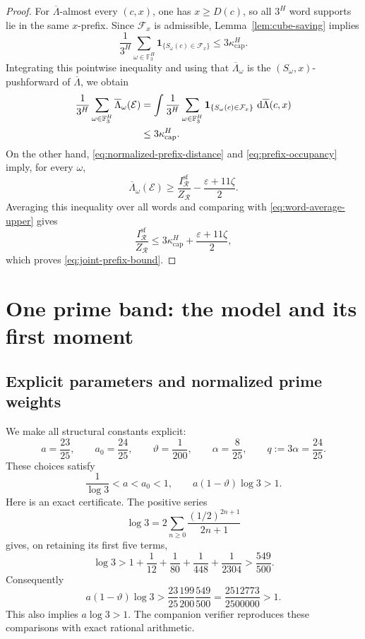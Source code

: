 \documentclass[11pt]{article}
\numberwithin{equation}{section}
\theoremstyle{plain}
\newcommand{\F}{\mathbb F}
\newcommand{\1}{\mathbf 1}
\newcommand{\dd}{\,\mathrm d}
\newcommand{\eps}{\varepsilon}
\newcommand{\cR}{\mathcal R}
\newcommand{\kappacap}{\kappa_{\mathrm{cap}}}
\begin{document}
\begin{proof}
For $\overline\Lambda$-almost every $(c,x)$, one has
$x\ge D(c)$, so all $3^H$ word supports lie in the same $x$-prefix.
Since $\mathcal F_x$ is admissible, Lemma~\ref{lem:cube-saving} implies
\[
 \frac1{3^H}\sum_{\omega\in\F_3^H}
 \1_{\{S_\omega(c)\in\mathcal F_x\}}
 \le3\kappacap^H.
\]
Integrating this pointwise inequality and using that
$\overline\Lambda_\omega$ is the $(S_\omega,x)$-pushforward of
$\overline\Lambda$, we obtain
\begin{align}
 \frac1{3^H}\sum_{\omega\in\F_3^H}
 \overline\Lambda_\omega(\mathcal E)
 &=\int\frac1{3^H}\sum_{\omega\in\F_3^H}
   \1_{\{S_\omega(c)\in\mathcal F_x\}}
   \,\dd\overline\Lambda(c,x)\notag\\
 &\le3\kappacap^H.                              \label{eq:word-average-upper}
\end{align}
On the other hand, \eqref{eq:normalized-prefix-distance} and
\eqref{eq:prefix-occupancy} imply, for every $\omega$,
\[
 \overline\Lambda_\omega(\mathcal E)
 \ge\frac{I_{\cR}^{\mathrm{sf}}}{Z_{\cR}}
      -\frac{\eps+11\zeta}{2}.
\]
Averaging this inequality over all words and comparing with
\eqref{eq:word-average-upper} gives
\[
 \frac{I_{\cR}^{\mathrm{sf}}}{Z_{\cR}}
 \le3\kappacap^H+\frac{\eps+11\zeta}{2},
\]
which proves \eqref{eq:joint-prefix-bound}.
\end{proof}

\section{One prime band: the model and its first moment}
\label{sec:firstmoment}

\subsection{Explicit parameters and normalized prime weights}

We make all structural constants explicit:
\begin{equation}\label{eq:parameters}
 a=\frac{23}{25},\qquad
 a_0=\frac{24}{25},\qquad
 \vartheta=\frac1{200},\qquad
 \alpha=\frac8{25},\qquad
 q:=3\alpha=\frac{24}{25}.
\end{equation}
These choices satisfy
\begin{equation}\label{eq:parameter-inequalities}
 \frac1{\log3}<a<a_0<1,
 \qquad
 a(1-\vartheta)\log3>1.
\end{equation}
Here is an exact certificate.  The positive series
\[
 \log3
 =2\sum_{n\ge0}\frac{(1/2)^{2n+1}}{2n+1}
\]
gives, on retaining its first five terms,
\[
 \log3>
 1+\frac1{12}+\frac1{80}+\frac1{448}+\frac1{2304}
 >\frac{549}{500}.
\]
Consequently
\[
 a(1-\vartheta)\log3
 >
 \frac{23}{25}\frac{199}{200}\frac{549}{500}
 =\frac{2512773}{2500000}>1.
\]
This also implies $a\log3>1$.  The companion verifier reproduces these
comparisons with exact rational arithmetic.
\end{document}
